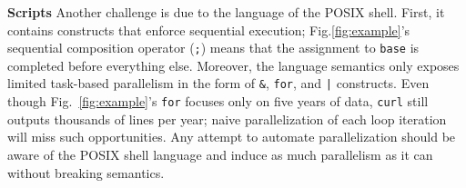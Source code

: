 \documentclass[letterpaper,twocolumn,10pt]{article}
\newcommand{\heading}[1]{\vspace{4pt}\noindent\textbf{#1}\enspace}
\newcommand{\ttt}[1]{\texttt{#1}}
\newcommand{\kk}[1]{[{\color{magenta}kk: #1}]}
\begin{document}


\heading{Scripts} %
Another challenge is due to the language of the POSIX shell. %
First, it contains constructs that enforce sequential execution;
   Fig.\ref{fig:example}'s sequential composition operator (\ttt{;}) means that the assignment to \ttt{base} is completed before everything else.
Moreover, the language semantics only exposes limited task-based parallelism in the form of \ttt{\&}, \ttt{for}, and \ttt{|} constructs.
Even though Fig.~\ref{fig:example}'s \ttt{for} focuses only on five years of data, \ttt{curl} still outputs thousands of lines per year;
  naive parallelization of each loop iteration will miss such opportunities.
Any attempt to automate parallelization should be aware of the POSIX shell language and induce as much parallelism as it can without breaking semantics.
\end{document}
